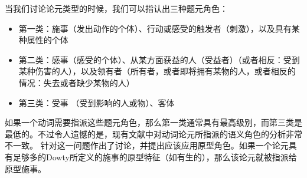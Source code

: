当我们讨论论元类型的时候，我们可以指认出三种题元角色：
\begin{itemize}
\item 第一类：施事（发出动作的个体）、行动或感受的触发者（刺激），以及具有某种属性的个体
\item 第二类：感事（感受的个体）、从某方面获益的人（受益者）（或者相反：受到某种伤害的人），以及领有者（所有者，或者即将拥有某物的人，或者相反的情况：失去或者缺少某物的人）
\item 第三类：受事 （受到影响的人或物）、客体
\end{itemize}
如果一个动词需要指派这些题元角色，那么第一类通常具有最高级别，而第三类是最低的。不过令人遗憾的是，现有文献中对动词论元所指派的语义角色的分析非常不一致。 \citet{Dowty91a}针对这一问题作出了讨论，并提出应该应用原型角色。如果一个论元具有足够多的Dowty所定义的施事的原型特征（如有生的），那么该论元就被指派给原型施事。
\nocite{Gruber65a-u,Fillmore68,Fillmore71a-u,Jackendoff72a-u,Dowty91a}

